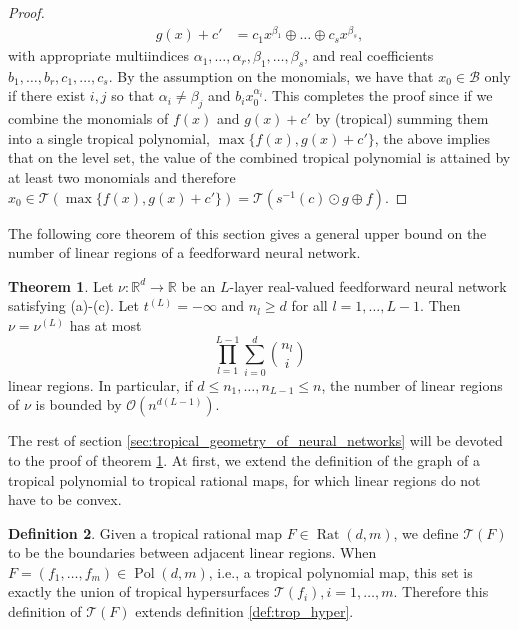 \documentclass{article}
\theoremstyle{definition}
\newtheorem{theorem}{Theorem}[section]
\newtheorem{definition}[theorem]{Definition}
\DeclareMathOperator{\Rat}{Rat}
\DeclareMathOperator{\Pol}{Pol}
\begin{document}
\begin{proof}
\begin{align*}
g(x) + c' &= c_1 x^{\beta_1} \oplus \dots \oplus c_s x^{\beta_s},
\end{align*}
with appropriate multiindices $\alpha_1 , \dots , \alpha_r, \beta_1 , \dots , \beta_s$, and real coefficients $b_1, \dots , b_r, c_1, \dots , c_s$. By the assumption on
the monomials, we have that $x_0 \in \mathcal{B} $ only if there exist $i, j$ so that $\alpha_i \neq \beta_j$ and $b_i x_0^{\alpha_i}$. This completes the proof since if we combine the monomials of $f(x)$ and $g(x) + c'$ by (tropical) summing them into a single tropical polynomial, $\max \{f(x), g(x) + c'\}$, the above implies that on the level set, the value of the combined tropical polynomial is attained by at least two monomials and therefore $x_0 \in \mathcal{T}(\max\{f(x), g(x) + c'\}) = \mathcal{T} (s^{-1}(c) \odot g \oplus f)$.
\end{proof}
The following core theorem of this section gives a general upper bound on the number of linear regions of a feedforward neural network.
\begin{theorem}\hspace{1sp}\cite[p.~8]{zhang2018tropical}
\label{theo:lin_reg}
Let $\nu : \mathbb{R}^{d} \to \mathbb{R}$ be an $L$-layer real-valued feedforward neural network satisfying (a)-(c). Let $t^{(L)}=-\infty$ and $n_{l} \geq d$ for all $l=1, \dots , L-1$. Then $\nu = \nu^{(L)}$ has at most
$$\displaystyle\prod^{L-1}_{l=1}\displaystyle\sum^{d}_{i=0}\binom{n_l}{i}$$
linear regions. In particular, if $d \leq n_1, \dots , n_{L-1} \leq n$, the number of linear regions of $\nu$ is bounded by $\mathcal{O}(n^{d(L-1)})$.
\end{theorem}

The rest of section \ref{sec:tropical_geometry_of_neural_networks} will be devoted to the proof of theorem \ref{theo:lin_reg}. At first, we extend the definition of the graph of a tropical polynomial to tropical rational maps, for which linear regions do not have to be convex.

\begin{definition}\hspace{1sp}\cite[p.~15]{zhang2018tropical}
Given a tropical rational map $F \in \Rat(d, m)$, we define $\mathcal{T}(F)$ to be the boundaries between adjacent linear regions. When $F=(f_1, \dots , f_m) \in \Pol(d, m)$, i.e., a tropical polynomial map, this set is exactly the union of tropical hypersurfaces $\mathcal{T}(f_i), i=1, \dots , m$. Therefore this definition of $\mathcal{T}(F)$ extends definition \ref{def:trop_hyper}.
\end{definition}
\end{document}
